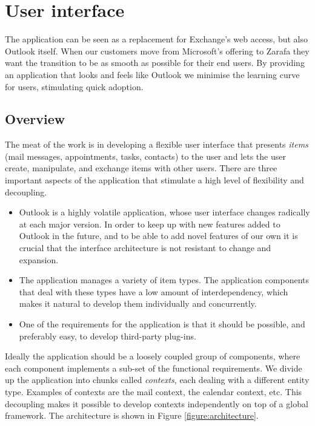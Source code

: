 \chapter{User interface}
\label{section:ui}

The application can be seen as a replacement for Exchange's web access, but also Outlook itself. When our
customers move from Microsoft's offering to Zarafa they want the transition to be as smooth as possible for
their end users. By providing an application that looks and feels like Outlook we minimise the learning 
curve for users, stimulating quick adoption.

\section{Overview}

The meat of the work is in developing a flexible user interface that presents \emph{items} (mail messages, 
appointments, tasks, contacts) to the user and lets the user create, manipulate, and exchange items with 
other users. There are three important aspects of the application that stimulate a high level of flexibility
and decoupling. 

\begin{itemize}
	\item{Outlook is a highly volatile application, 
	whose user interface changes radically at each major version. In order to keep up with new features added 
	to Outlook in the future, and to be able to add novel features of our own it is crucial that the interface
	architecture is not resistant to change and expansion.}
	\item{The application manages a variety of item types. 
	The application components that deal with these types have a low amount of interdependency, which
	makes it natural to develop them individually and concurrently.}
	\item{One of the requirements for the application is that it should be possible, and preferably easy,
	to develop third-party plug-ins.}
\end{itemize}

Ideally the application should be a loosely coupled group of components, where each component implements a sub-set 
of the functional requirements. We divide up the application into chunks called \emph{contexts}, each dealing with
a different entity type. Examples of contexts are the mail context, the calendar context, etc. This decoupling 
makes it possible to develop contexts independently on top of a global framework. The architecture is shown 
in Figure \ref{figure:architecture}.

